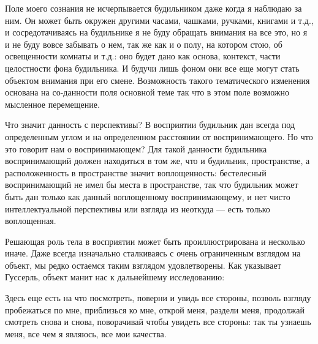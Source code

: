 \documentclass[11pt]{book}
\begin{document}
Поле моего сознания не исчерпывается будильником даже когда я наблюдаю за ним. Он может быть окружен другими часами, чашками, ручками, книгами и т.д., и сосредотачиваясь на будильнике я не буду обращать внимания на все это, но я и не буду вовсе забывать о нем, так же как и о полу, на котором стою, об освещенности комнаты и т.д.: оно будет дано как основа, контекст, части целостности фона будильника. И будучи лишь фоном они все еще могут стать объектом внимания при его смене. Возможность такого тематического изменения основана на со-данности поля основной теме так что в этом поле возможно мысленное перемещение.

Что значит данность с перспективы? В восприятии будильник дан всегда под определенным углом и на определенном расстоянии от воспринимающего. Но что это говорит нам о воспринимающем? Для такой данности будильника воспринимающий должен находиться в том же, что и будильник, пространстве, а расположенность в пространстве значит воплощенность: бестелесный воспринимающий не имел бы места в пространстве, так что будильник может быть дан только как данный воплощенному воспринимающему, и нет чисто интеллектуальной перспективы или взгляда из неоткуда --- есть только воплощенная.

Решающая роль тела в восприятии может быть проиллюстрирована и несколько иначе. Даже всегда изначально сталкиваясь с очень ограниченным взглядом на объект, мы редко остаемся таким взглядом удовлетворены. Как указывает Гуссерль, объект манит нас к дальнейшему исследованию:

\smallskip
{}\relax
{}\relax

Здесь еще есть на что посмотреть, поверни и увидь все стороны, позволь взгляду пробежаться по мне, приблизься ко мне, открой меня, раздели меня, продолжай смотреть снова и снова, поворачивай чтобы увидеть все стороны: так ты узнаешь меня, все чем я являюсь, все мои качества.

\relax
{}\relax
\smallskip
\end{document}
